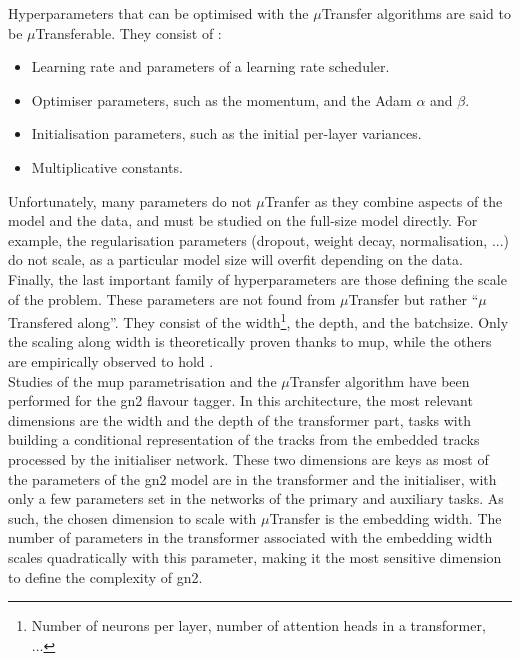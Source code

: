 Hyperparameters that can be optimised with the $\mu$Transfer algorithms are said to be $\mu$Transferable. They consist of \cite{yang2021tuning}: 
\begin{itemize}
  \item Learning rate and parameters of a learning rate scheduler.
  \item Optimiser parameters, such as the momentum, and the Adam $\alpha$ and $\beta$.
  \item Initialisation parameters, such as the initial per-layer variances.
  \item Multiplicative constants.
\end{itemize}
Unfortunately, many parameters do not $\mu$Tranfer as they combine aspects of the model and the data, and must be studied on the full-size model directly. For example, the regularisation parameters (dropout, weight decay, normalisation, ...) do not scale, as a particular model size will overfit depending on the data. Finally, the last important family of hyperparameters are those defining the scale of the problem. These parameters are not found from $\mu$Transfer but rather ``$\mu$Transfered along''. They consist of the width\footnote{Number of neurons per layer, number of attention heads in a transformer, ...}, the depth, and the batchsize. Only the scaling along width is theoretically proven thanks to \gls{mup}, while the others are empirically observed to hold \cite{yang2021tuning}.\\

Studies of the \gls{mup} parametrisation and the $\mu$Transfer algorithm have been performed for the \gls{gn2} flavour tagger. In this architecture, the most relevant dimensions are the width and the depth of the transformer part, tasks with building a conditional representation of the tracks from the embedded tracks processed by the initialiser network. These two dimensions are keys as most of the parameters of the \gls{gn2} model are in the transformer and the initialiser, with only a few parameters set in the networks of the primary and auxiliary tasks. As such, the chosen dimension to scale with $\mu$Transfer is the embedding width. The number of parameters in the transformer associated with the embedding width scales quadratically with this parameter, making it the most sensitive dimension to define the complexity of \gls{gn2}. 

